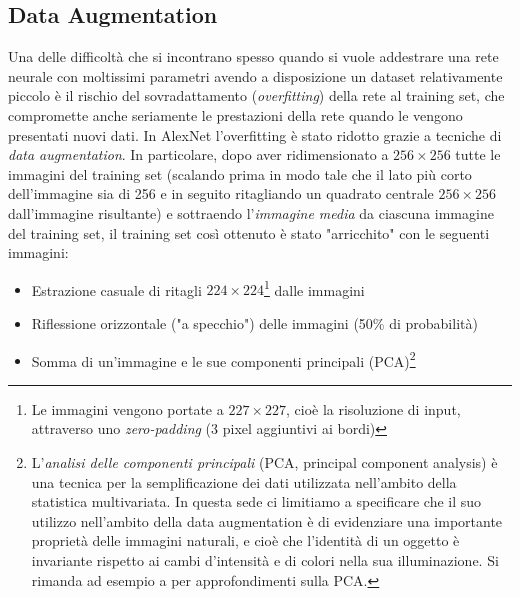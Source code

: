 \subsection{Data Augmentation}
\label{augmentationAlexnet}
Una delle difficoltà che si incontrano spesso quando si vuole addestrare una rete neurale con moltissimi parametri avendo a disposizione un dataset relativamente piccolo è il rischio del sovradattamento (\textit{overfitting}) della rete al training set, che compromette anche seriamente le prestazioni della rete quando le vengono presentati nuovi dati.
In AlexNet l'overfitting è stato ridotto grazie a tecniche di \textit{data augmentation}. In particolare, dopo aver ridimensionato a $256\times 256$ tutte le immagini del training set (scalando prima in modo tale che il lato più corto dell'immagine sia di 256 e in seguito ritagliando un quadrato centrale $256\times 256$ dall'immagine risultante) e sottraendo l'\textit{immagine media} da ciascuna immagine del training set, il training set così ottenuto è stato "arricchito" con le seguenti immagini:
\begin{itemize}
\item Estrazione casuale di ritagli $224\times 224$\footnote{Le immagini vengono portate a $227\times 227$, cioè la risoluzione di input, attraverso uno \textit{zero-padding} (3 pixel aggiuntivi ai bordi)} dalle immagini
\item Riflessione orizzontale ("a specchio") delle immagini (50\% di probabilità)
\item Somma di un'immagine e le sue componenti principali (PCA)\footnote{L'\textit{analisi delle componenti principali} (PCA, principal component analysis) è una tecnica per la semplificazione dei dati utilizzata nell'ambito della statistica multivariata. In questa sede ci limitiamo a specificare che il suo utilizzo nell'ambito della data augmentation è di evidenziare una importante proprietà delle immagini naturali, e cioè che l'identità di un oggetto è invariante rispetto ai cambi d'intensità e di colori nella sua illuminazione. Si rimanda ad esempio a \cite{PCA} per approfondimenti sulla PCA.}
\end{itemize}

